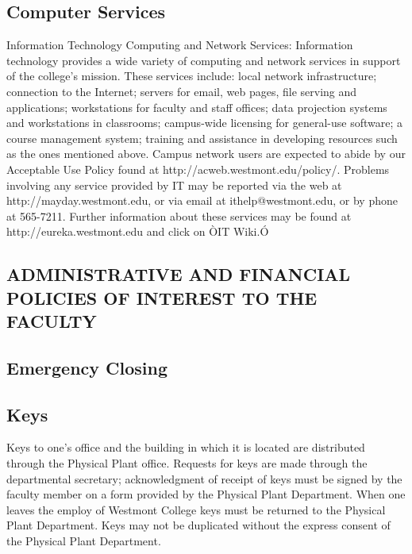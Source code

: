 \documentclass[letterpaper, 11pt]{article}
\begin{document}
	\subsection{Computer Services}
		Information Technology Computing and Network Services:  Information technology provides a wide variety of computing and network services in support of the college's mission.  These services include:  local network infrastructure; connection to the Internet; servers for email, web pages, file serving and applications; workstations for faculty and staff offices; data projection systems and workstations in classrooms; campus-wide licensing for general-use software; a course management system; training and assistance in developing resources such as the ones mentioned above.
		Campus network users are expected to abide by our Acceptable Use Policy found at http://acweb.westmont.edu/policy/.  Problems involving any service provided by IT may be reported via the web at http://mayday.westmont.edu, or via email at ithelp@westmont.edu, or by phone at 565-7211.  Further information about these services may be found at http://eureka.westmont.edu and click on ÒIT Wiki.Ó

	\subsection{ADMINISTRATIVE AND FINANCIAL POLICIES OF INTEREST TO THE FACULTY}
	\subsection{Emergency Closing}
	\subsection{Keys}
		Keys to one's office and the building in which it is located are distributed through the Physical Plant office.  Requests for keys are made through the departmental secretary; acknowledgment of receipt of keys must be signed by the faculty member on a form provided by the Physical Plant Department.  When one leaves the employ of Westmont College keys must be returned to the Physical Plant Department.  Keys may not be duplicated without the express consent of the Physical Plant Department.
\end{document}
